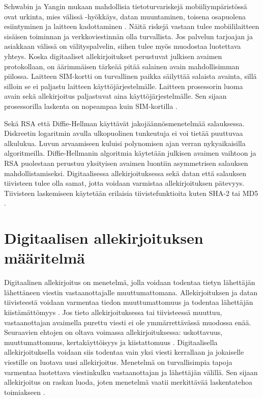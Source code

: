 \documentclass[finnish]{tktltiki2}
\theoremstyle{definition}
\theoremstyle{remark}
\begin{document}
Schwabin ja Yangin mukaan mahdollisia tietoturvariskejä mobiiliympäristössä ovat urkinta, mies välissä -hyökkäys, datan muuntaminen, toisena osapuolena esiintyminen ja laitteen kadottaminen \cite{enti}. Näitä riskejä vastaan tulee mobiililaitteen sisäisen toiminnan ja verkkoviestinnän olla turvallista. Jos palvelun tarjoajan ja asiakkaan välissä on välityspalvelin, siihen tulee myös muodostaa luotettava yhteys.
Koska digitaaliset allekirjoitukset perustuvat julkisen avaimen protokollaan, on äärimmäisen tärkeää pitää salainen avain mahdollisimman piilossa. Laitteen SIM-kortti on turvallinen paikka säilyttää salaista avainta, sillä silloin se ei paljastu laitteen käyttöjärjestelmälle. Laitteen prosessorin luoma avain sekä allekirjoitus paljastuvat aina käyttöjärjestelmälle. Sen sijaan prosessorilla laskenta on nopeampaa kuin SIM-kortilla \cite{proxy}. 

Sekä RSA että Diffie-Hellman käyttävät jakojäännösmenetelmää salauksessa.
Diskreetin logaritmin avulla ulkopuolinen tunkeutuja ei voi tietää puuttuvaa alkulukua. Luvun arvaamiseen kuluisi polynomisen ajan verran nykyaikaisilla algoritmeilla. Diffie-Hellmanin algoritmia käytetään julkisen avaimen vaihtoon ja RSA puolestaan perustuu yksityisen avaimen luontiin asymmetrisen salauksen mahdollistamiseksi. Digitaalisessa allekirjoituksessa sekä datan että salauksen tiivisteen tulee olla samat, jotta voidaan varmistaa allekirjoituksen pätevyys. Tiivisteen laskemiseen käytetään erilaisia tiivistefunktioita kuten SHA-2 tai MD5 \cite{gene}.         


\section{Digitaalisen allekirjoituksen määritelmä}

Digitaalinen allekirjoitus on menetelmä, jolla voidaan todentaa tietyn lähettäjän lähettäneen viestin vastaanottajalle muuttumattomana. Allekirjoituksen ja datan tiivisteestä voidaan varmentaa tiedon muuttumattomuus ja todentaa lähettäjän kiistämättömyys \cite{moen}. Jos tieto allekirjoituksessa tai tiivisteessä muuttuu, vastaanottajan avaimella purettu viesti ei ole ymmärrettävässä muodossa enää. Seuraavien ehtojen on oltava voimassa allekirjoituksessa: uskottavuus, muuttumattomuus, kertakäyttöisyys ja kiistattomuus \cite{e-c}. Digitaalisella allekirjoituksella voidaan siis todentaa vain yksi viesti kerrallaan ja jokaiselle viestille on luotava uusi allekirjoitus. Menetelmä on turvallisimpia tapoja varmentaa luotettava viestinkulku vastaanottajan ja lähettäjän välillä. Sen sijaan allekirjoitus on raskan luoda, joten menetelmä vaatii merkittävää laskentatehoa toimiakseen \cite{proxy}.
\end{document}
